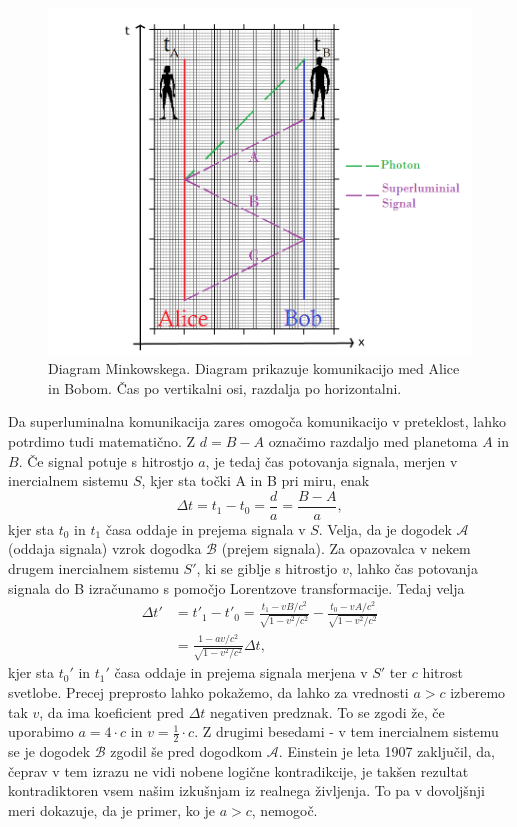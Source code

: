 \documentclass[12pt]{article}
\begin{document}
\begin{figure}[h]
\includegraphics[width=12cm]{special-relativity.png}
\centering
\caption{Diagram Minkowskega. Diagram prikazuje komunikacijo med Alice in Bobom. Čas po vertikalni osi, razdalja po horizontalni. \cite{marcocerezoEntanglementHowIt2015}}
\label{fig:minkowski}
\end{figure}

\par
Da superluminalna komunikacija zares omogoča komunikacijo v preteklost, lahko potrdimo tudi matematično. Z $d = B - A$ označimo razdaljo med planetoma $A$ in $B$. Če signal potuje s hitrostjo $a$, je tedaj čas potovanja signala, merjen v inercialnem sistemu $S$, kjer sta točki A in B pri miru, enak
\begin{equation} \label{eq2}
\Delta t=t_{1}-t_{0}= \frac{d}{a} = \frac{B - A}{a},
\end{equation}
kjer sta $t_0$ in $t_1$ časa oddaje in prejema signala v $S$.
Velja, da je dogodek $\mathcal{A}$ (oddaja signala) vzrok dogodka $\mathcal{B}$ (prejem signala). Za opazovalca v nekem drugem inercialnem sistemu $S'$, ki se giblje s hitrostjo $v$, lahko čas potovanja signala do B izračunamo s pomočjo Lorentzove transformacije. Tedaj velja 
\begin{equation} \label{eq3}
\begin{split}
\Delta t' & =t'_{1}-t'_{0}=\frac{t_{1}-vB/c^{2}}{\sqrt{1-v^{2}/c^{2}}}-\frac{t_{0}-vA/c^{2}}{\sqrt{1-v^{2}/c^{2}}}\\
 & =\frac{1-av/c^{2}}{\sqrt{1-v^{2}/c^{2}}}\Delta t,
\end{split}
\end{equation}
kjer sta $t_0'$ in $t_1'$ časa oddaje in prejema signala merjena v $S'$ ter $c$ hitrost svetlobe. Precej preprosto lahko pokažemo, da lahko za vrednosti $a > c$ izberemo tak $v$, da ima koeficient pred $\Delta t$ negativen predznak. To se zgodi že, če uporabimo $a = 4\cdot c$ in $v = \frac{1}{2} \cdot c$. Z drugimi besedami - v tem inercialnem sistemu se je dogodek $\mathcal{B}$ zgodil še pred dogodkom $\mathcal{A}$. Einstein je leta 1907 zaključil, da, čeprav v tem izrazu ne vidi nobene logične kontradikcije, je takšen rezultat kontradiktoren vsem našim izkušnjam iz realnega življenja. To pa v dovoljšnji meri dokazuje, da je primer, ko je $a > c$, nemogoč. \cite{TachyonicAntitelephone2022a}
\end{document}
